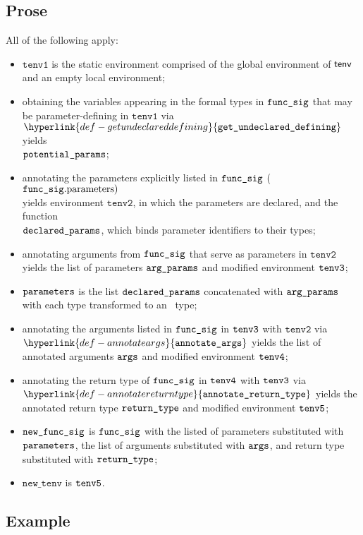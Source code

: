 \documentclass{book}
\newcommand\ProseOrTypeError[0]{\ProseTerminateAs{\TypeErrorConfig}}
\newcommand\annotateargs[0]{\hyperlink{def-annotateargs}{\texttt{annotate\_args}}}
\newcommand\annotatereturntype[0]{\hyperlink{def-annotatereturntype}{\texttt{annotate\_return\_type}}}
\newcommand\getundeclareddefining[0]{\hyperlink{def-getundeclareddefining}{\texttt{get\_undeclared\_defining}}}
\newcommand\newtenv[0]{\texttt{new\_tenv}}
\newcommand\tenvone[0]{\texttt{tenv1}}
\newcommand\tenvtwo[0]{\texttt{tenv2}}
\begin{document}
\subsection{Prose}
All of the following apply:
\begin{itemize}
  \item $\tenvone$ is the static environment comprised of the global environment of $\textsf{tenv}$ and an empty local environment;
  \item obtaining the variables appearing in the formal types in $\texttt{func\_sig}$ that may be parameter-defining
        in $\tenvone$ via $\getundeclareddefining$ yields \\ $\texttt{potential\_params}$;
  \item annotating the parameters explicitly listed in $\texttt{func\_sig}$ ($\texttt{func\_sig}.\text{parameters})$ \\
        yields environment $\tenvtwo$, in which the parameters are declared,
        and the function \\
        $\texttt{declared\_params}$, which binds parameter identifiers to their types\ProseOrTypeError;
  \item annotating arguments from $\texttt{func\_sig}$ that serve as parameters in $\tenvtwo$ yields the list of parameters
        $\texttt{arg\_params}$ and modified environment $\texttt{tenv3}$\ProseOrTypeError;
  \item $\texttt{parameters}$ is the list $\texttt{declared\_params}$ concatenated with $\texttt{arg\_params}$ with each type
        transformed to an \optional\ type;
  \item annotating the arguments listed in $\texttt{func\_sig}$ in $\texttt{tenv3}$ with $\tenvtwo$ via \\
        $\annotateargs$ yields the list of annotated
        arguments $\texttt{args}$ and modified environment $\texttt{tenv4}$\ProseOrTypeError;
  \item annotating the return type of $\texttt{func\_sig}$ in $\texttt{tenv4}$ with $\texttt{tenv3}$ via \\ $\annotatereturntype$ yields
        the annotated return type $\texttt{return\_type}$ and modified environment $\texttt{tenv5}$\ProseOrTypeError;
  \item $\texttt{new\_func\_sig}$ is $\texttt{func\_sig}$ with the listed of parameters substituted with \\ $\texttt{parameters}$,
        the list of arguments substituted with $\texttt{args}$, and return type substituted with $\texttt{return\_type}$;
  \item $\newtenv$ is $\texttt{tenv5}$.
\end{itemize}
\subsection{Example}
\end{document}
